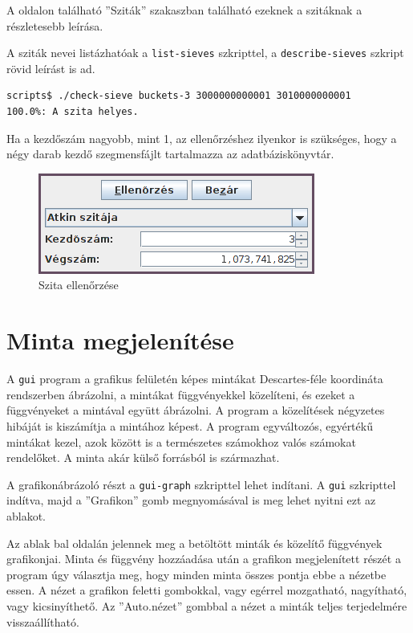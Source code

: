 A \pageref{sec:szitak} oldalon található ''Sziták'' szakaszban található ezeknek a szitáknak a részletesebb leírása.

A sziták nevei listázhatóak a \texttt{list-sieves} szkripttel, a \texttt{describe-sieves} szkript rövid leírást is ad.

\begin{lstlisting}[language=bash]
scripts$ ./check-sieve buckets-3 3000000000001 3010000000001
100.0%: A szita helyes.
\end{lstlisting}

Ha a kezdőszám nagyobb, mint 1, az ellenőrzéshez ilyenkor is szükséges, hogy a négy darab kezdő szegmensfájlt tartalmazza az adatbáziskönyvtár.

\begin{figure}[H]
\caption{Szita ellenőrzése}
\centering
\includegraphics[scale=1]{check-sieve.png}
\end{figure}

\section{Minta megjelenítése}

A \texttt{gui} program a grafikus felületén képes mintákat Descartes-féle koordináta rendszerben ábrázolni, a mintákat függvényekkel közelíteni, és ezeket a függvényeket a mintával együtt ábrázolni.
A program a közelítések négyzetes hibáját is kiszámítja a mintához képest.
A program egyváltozós, egyértékű mintákat kezel, azok között is a természetes számokhoz valós számokat rendelőket.
A minta akár külső forrásból is származhat.

A grafikonábrázoló részt a \texttt{gui-graph} szkripttel lehet indítani. A \texttt{gui} szkripttel indítva, majd a ''Grafikon'' gomb megnyomásával is meg lehet nyitni ezt az ablakot.

Az ablak bal oldalán jelennek meg a betöltött minták és közelítő függvények grafikonjai.
Minta és függvény hozzáadása után a grafikon megjelenített részét a program úgy választja meg, hogy minden minta összes pontja ebbe a nézetbe essen.
A nézet a grafikon feletti gombokkal, vagy egérrel mozgatható, nagyítható, vagy kicsinyíthető.
Az ''Auto.nézet'' gombbal a nézet a minták teljes terjedelmére visszaállítható.

